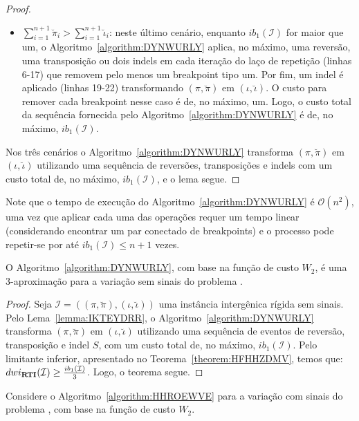 \begin{proof}
\begin{itemize}
    \item $\sum_{i=1}^{n+1}\breve\pi_i > \sum_{i=1}^{n+1}\breve\iota_i$: neste último cenário, enquanto $ib_1(\mathcal{I})$ for maior que um, o Algoritmo~\ref{algorithm:DYNWURLY} aplica, no máximo, uma reversão, uma transposição ou dois indels em cada iteração do laço de repetição (linhas 6-17) que removem pelo menos um breakpoint tipo um. Por fim, um indel é aplicado (linhas 19-22) transformando $(\pi,\breve\pi)$ em $(\iota,\breve\iota)$. O custo para remover cada breakpoint nesse caso é de, no máximo, um. Logo, o custo total da sequência fornecida pelo Algoritmo~\ref{algorithm:DYNWURLY} é de, no máximo, $ib_1(\mathcal{I})$. 
  \end{itemize}
  Nos três cenários o Algoritmo~\ref{algorithm:DYNWURLY} transforma $(\pi,\breve\pi)$ em $(\iota,\breve\iota)$ utilizando uma sequência de reversões, transposições e indels com um custo total de, no máximo, $ib_1(\mathcal{I})$, e o lema segue.
\end{proof}

Note que o tempo de execução do Algoritmo~\ref{algorithm:DYNWURLY} é $\mathcal{O}(n^2)$, uma vez que aplicar cada uma das operações requer um tempo linear (considerando encontrar um par conectado de breakpoints) e o processo pode repetir-se por até $ib_1(\mathcal{I}) \le n + 1$ vezes.

\begin{theorem}\label{theorem:HXFXWAIA}
O Algoritmo~\ref{algorithm:DYNWURLY}, com base na função de custo $W_2$, é uma $3$-aproximação para a variação sem sinais do problema \SbWIRTI{}.
\end{theorem}
\begin{proof}
Seja $\mathcal{I}=((\pi,\breve\pi),(\iota,\breve\iota))$ uma instância intergênica rígida sem sinais. Pelo Lema~\ref{lemma:IKTEYDRR}, o Algoritmo~\ref{algorithm:DYNWURLY} transforma $(\pi,\breve\pi)$ em $(\iota,\breve\iota)$ utilizando uma sequência de eventos de reversão, transposição e indel $S$, com um custo total de, no máximo, $ib_1(\mathcal{I})$. Pelo limitante inferior, apresentado no Teorema~\ref{theorem:HFHHZDMV}, temos que: $dwi_{\textbf{RTI}}(\mathcal{I}) \ge \frac{ib_1(\mathcal{I})}{3}$. Logo, o teorema segue.
\end{proof}

Considere o Algoritmo~\ref{algorithm:HHROEWVE} para a variação com sinais do problema \SbWIRTI{}, com base na função de custo $W_2$.




